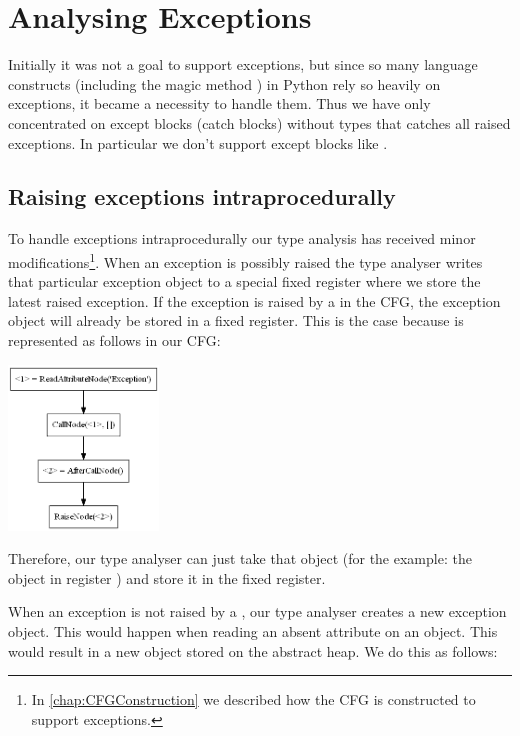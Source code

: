 \chapter{Analysing Exceptions}
\label{chapter:Exceptions}
Initially it was not a goal to support exceptions, but since so many language constructs (including the magic method ) in Python rely so heavily on exceptions, it became a necessity to handle them. Thus we have only concentrated on except blocks (catch blocks) without types that catches all raised exceptions. In particular we don't support except blocks like .

\section{Raising exceptions intraprocedurally}
To handle exceptions intraprocedurally our type analysis has received minor modifications\footnote{In \autoref{chap:CFGConstruction} we described how the CFG is constructed to support exceptions.}. When an exception is possibly raised the type analyser writes that particular exception object to a special fixed register where we store the latest raised exception. If the exception is raised by a  in the CFG, the exception object will already be stored in a fixed register. This is the case because  is represented as follows in our CFG:

\begin{listing}[H]
	\begin{center}
		\includegraphics[width=0.3\textwidth]{images/raiseexception.png}
	\end{center}
	\vspace{-20pt}
\end{listing}

Therefore, our type analyser can just take that object (for the example: the object in register ) and store it in the fixed register.

When an exception is not raised by a , our type analyser creates a new exception object. This would happen when reading an absent attribute on an object. This would result in a new  object stored on the abstract heap. We do this as follows:

